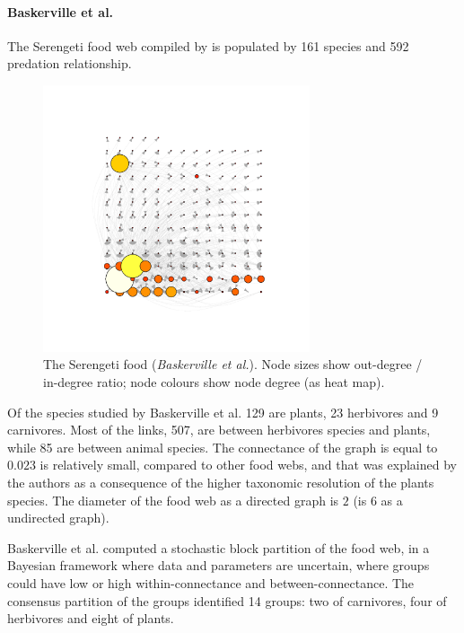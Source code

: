 \documentclass[12pt]{article}
\theoremstyle{definition}
\begin{document}
\paragraph{Baskerville et al.} The Serengeti food web compiled by \cite{baskerville2011spatial} is populated by 161 species and 592 predation relationship.
\begin{figure}[!ht]\label{fig:S_B}
\centering
\includegraphics[trim = 30mm 30mm 30mm 30mm, clip, width=0.7\textwidth]{Images/Graph_Serengeti_Baskerville_tp.pdf}
\caption{The Serengeti food (\textit{Baskerville et al.}). Node sizes show out-degree / in-degree ratio;  node colours show node degree (as heat map).}
\end{figure}

Of the species studied by Baskerville et al. 129 are plants, 23 herbivores and 9 carnivores. Most of the links, 507, are between herbivores species and plants, while 85 are between animal species. The connectance of the graph is equal to $0.023$ is relatively small, compared to other food webs, and that was explained by the authors as a consequence of the higher taxonomic resolution of the plants species. The diameter of the food web as a directed graph is $2$ (is $6$ as a undirected graph).

Baskerville et al. computed a stochastic block partition of the food web, in a Bayesian framework where data and parameters are uncertain, where groups could have low or high within-connectance and between-connectance. The consensus partition of the groups identified 14 groups: two of carnivores, four of herbivores and eight of plants.
\end{document}
